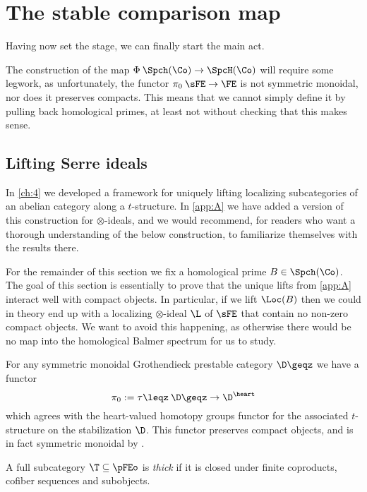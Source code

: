 


\section{The stable comparison map}

Having now set the stage, we can finally start the main act. 

The construction of the map $\Phi\: \Spch(\Co)\to \SpcH(\Co)$ will require some legwork, as unfortunately, the functor $\pi_0\: \sFE \to \FE$ is not symmetric monoidal, nor does it preserves compacts. This means that we cannot simply define it by pulling back homological primes, at least not without checking that this makes sense. 



\subsection{Lifting Serre ideals}

In \cref{ch:4} we developed a framework for uniquely lifting localizing subcategories of an abelian category along a $t$-structure. In \cref{app:A} we have added a version of this construction for $\otimes$-ideals, and we would recommend, for readers who want a thorough understanding of the below construction, to familiarize themselves with the results there. 

For the remainder of this section we fix a homological prime $B\in \Spch(\Co)$. The goal of this section is essentially to prove that the unique lifts from \cref{app:A} interact well with compact objects. In particular, if we lift $\Loc(B)$ then we could in theory end up with a localizing $\otimes$-ideal $\L$ of $\sFE$ that contain no non-zero compact objects. We want to avoid this happening, as otherwise there would be no map into the homological Balmer spectrum for us to study. 

For any symmetric monoidal Grothendieck prestable category $\D\geqz$ we have a functor 
\[\pi_0 := \tau\leqz \: \D\geqz \to \D^\heart\]
which agrees with the heart-valued homotopy groups functor for the associated $t$-structure on the stabilization $\D$. This functor preserves compact objects, and is in fact symmetric monoidal by \cite[A.12]{antieau_nikolaus_2020}. 

\begin{definition}
    A full subcategory $\T \subseteq \pFEo$ is \emph{thick} if it is closed under finite coproducts, cofiber sequences and subobjects. 
\end{definition}

